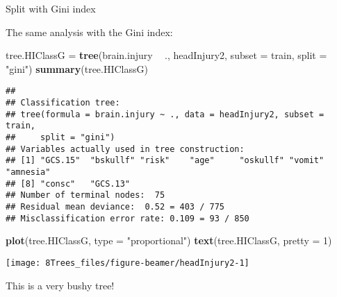 \documentclass[10pt,ignorenonframetext,]{beamer}
\newenvironment{Shaded}{\begin{snugshade}}{\end{snugshade}}
\newcommand{\DataTypeTok}[1]{\textcolor[rgb]{0.13,0.29,0.53}{#1}}
\newcommand{\DecValTok}[1]{\textcolor[rgb]{0.00,0.00,0.81}{#1}}
\newcommand{\KeywordTok}[1]{\textcolor[rgb]{0.13,0.29,0.53}{\textbf{#1}}}
\newcommand{\NormalTok}[1]{#1}
\newcommand{\OperatorTok}[1]{\textcolor[rgb]{0.81,0.36,0.00}{\textbf{#1}}}
\newcommand{\StringTok}[1]{\textcolor[rgb]{0.31,0.60,0.02}{#1}}
\begin{document}
\begin{frame}[fragile]

\begin{block}{Split with Gini index}

\vspace{2mm}

The same analysis with the Gini index:

\vspace{2mm}

\scriptsize

\begin{Shaded}
\begin{Highlighting}[]
\NormalTok{tree.HIClassG =}\StringTok{ }\KeywordTok{tree}\NormalTok{(brain.injury }\OperatorTok{~}\StringTok{ }\NormalTok{., headInjury2, }\DataTypeTok{subset =}\NormalTok{ train, }\DataTypeTok{split =} \StringTok{"gini"}\NormalTok{)}
\KeywordTok{summary}\NormalTok{(tree.HIClassG)}
\end{Highlighting}
\end{Shaded}

\begin{verbatim}
## 
## Classification tree:
## tree(formula = brain.injury ~ ., data = headInjury2, subset = train, 
##     split = "gini")
## Variables actually used in tree construction:
## [1] "GCS.15"  "bskullf" "risk"    "age"     "oskullf" "vomit"   "amnesia"
## [8] "consc"   "GCS.13" 
## Number of terminal nodes:  75 
## Residual mean deviance:  0.52 = 403 / 775 
## Misclassification error rate: 0.109 = 93 / 850
\end{verbatim}

\end{block}

\end{frame}

\begin{frame}[fragile]

\scriptsize

\begin{Shaded}
\begin{Highlighting}[]
\KeywordTok{plot}\NormalTok{(tree.HIClassG, }\DataTypeTok{type =} \StringTok{"proportional"}\NormalTok{)}
\KeywordTok{text}\NormalTok{(tree.HIClassG, }\DataTypeTok{pretty =} \DecValTok{1}\NormalTok{)}
\end{Highlighting}
\end{Shaded}

\begin{center}\texttt{[image: 8Trees\_files/figure-beamer/headInjury2-1]} \end{center}

\normalsize

This is a very bushy tree!

\end{frame}
\end{document}
